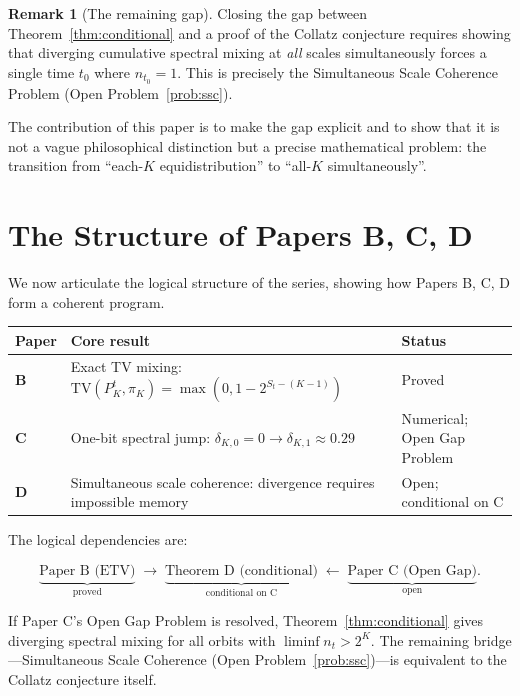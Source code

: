 \documentclass[12pt]{article}
\theoremstyle{definition}
\newtheorem{remark}[theorem]{Remark}
\newcommand{\TV}{\mathrm{TV}}
\begin{document}
\begin{remark}[The remaining gap]
Closing the gap between Theorem~\ref{thm:conditional} and a proof of the Collatz conjecture requires showing that diverging cumulative spectral mixing at \emph{all} scales simultaneously forces a single time $t_0$ where $n_{t_0} = 1$. This is precisely the Simultaneous Scale Coherence Problem (Open Problem~\ref{prob:ssc}).
\end{remark}

The contribution of this paper is to make the gap explicit and to show that it is not a vague philosophical distinction but a precise mathematical problem: the transition from ``each-$K$ equidistribution'' to ``all-$K$ simultaneously''.

\section{The Structure of Papers B, C, D}
\label{sec:structure}

We now articulate the logical structure of the series, showing how Papers B, C, D form a coherent program.

\begin{center}
\renewcommand{\arraystretch}{1.4}
\begin{tabular}{@{}p{1.8cm}p{4.5cm}p{4.5cm}@{}}
\toprule
Paper & Core result & Status \\
\midrule
\textbf{B} & Exact TV mixing: $\TV(P_K^t, \pi_K) = \max(0, 1-2^{S_t-(K-1)})$ & Proved \\
\textbf{C} & One-bit spectral jump: $\delta_{K,0}=0 \to \delta_{K,1}\approx 0.29$ & Numerical; Open Gap Problem \\
\textbf{D} & Simultaneous scale coherence: divergence requires impossible memory & Open; conditional on C \\
\bottomrule
\end{tabular}
\end{center}

The logical dependencies are:

\[
  \underbrace{\text{Paper B (ETV)}}_{\text{proved}} \;\longrightarrow\; \underbrace{\text{Theorem D (conditional)}}_{\text{conditional on C}} \;\longleftarrow\; \underbrace{\text{Paper C (Open Gap)}}_{\text{open}}.
\]

If Paper C's Open Gap Problem is resolved, Theorem~\ref{thm:conditional} gives diverging spectral mixing for all orbits with $\liminf n_t > 2^K$. The remaining bridge---Simultaneous Scale Coherence (Open Problem~\ref{prob:ssc})---is equivalent to the Collatz conjecture itself.
\end{document}

